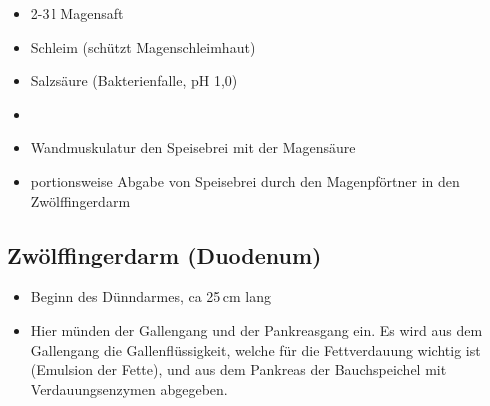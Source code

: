 
\begin{itemize}
    \item 2-3\,l Magensaft
    \item Schleim (schützt  Magenschleimhaut)
    \item Salzsäure (Bakterienfalle, pH
    1,0)
    \item {}
    \item Wandmuskulatur  den Speisebrei
    mit der Magensäure
    \item portionsweise Abgabe von Speisebrei durch den
    Magenpförtner   in
    den Zwölffingerdarm
\end{itemize}






\subsection{Zwölffingerdarm (Duodenum)}

\begin{itemize}
\item Beginn des Dünndarmes, ca 25\,cm lang
\item Hier münden der Gallengang und der Pankreasgang
ein. Es wird aus dem Gallengang die Gallenflüssigkeit,
welche für die Fettverdauung wichtig ist (Emulsion der
Fette), und aus dem Pankreas der Bauchspeichel mit
Verdauungsenzymen abgegeben. 
\end{itemize}

